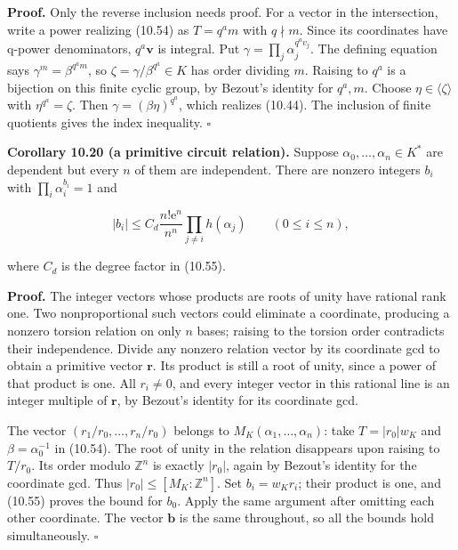 \documentclass[
  11pt,
  a4paper,
]{article}
\begin{document}
\textbf{Proof.} Only the reverse inclusion needs proof. For a vector in
the intersection, write a power realizing (10.54) as \(T=q^a m\) with
\(q\nmid m\). Since its coordinates have q-power denominators,
\(q^a\boldsymbol v\) is integral. Put
\(\gamma=\prod_j\alpha_j^{q^av_j}\). The defining equation says
\(\gamma^m=\beta^{q^am}\), so \(\zeta=\gamma/\beta^{q^a}\in K\) has
order dividing \(m\). Raising to \(q^a\) is a bijection on this finite
cyclic group, by Bezout's identity for \(q^a,m\). Choose
\(\eta\in\langle\zeta\rangle\) with \(\eta^{q^a}=\zeta\). Then
\(\gamma=(\beta\eta)^{q^a}\), which realizes (10.44). The inclusion of
finite quotients gives the index inequality. \(\square\)

\textbf{Corollary 10.20 (a primitive circuit relation).} Suppose
\(\alpha_0,\ldots,\alpha_n\in K^*\) are dependent but every \(n\) of
them are independent. There are nonzero integers \(b_i\) with
\(\prod_i\alpha_i^{b_i}=1\) and

\[
|b_i|\le C_d\frac{n!\mathrm e^n}{n^n}
\prod_{j\ne i}h(\alpha_j)\qquad(0\le i\le n),
\tag{10.58}
\]

where \(C_d\) is the degree factor in (10.55).

\textbf{Proof.} The integer vectors whose products are roots of unity
have rational rank one. Two nonproportional such vectors could eliminate
a coordinate, producing a nonzero torsion relation on only \(n\) bases;
raising to the torsion order contradicts their independence. Divide any
nonzero relation vector by its coordinate gcd to obtain a primitive
vector \(\boldsymbol r\). Its product is still a root of unity, since a
power of that product is one. All \(r_i\ne0\), and every integer vector
in this rational line is an integer multiple of \(\boldsymbol r\), by
Bezout's identity for its coordinate gcd.

The vector \((r_1/r_0,\ldots,r_n/r_0)\) belongs to
\(M_K(\alpha_1,\ldots,\alpha_n)\): take \(T=|r_0|w_K\) and
\(\beta=\alpha_0^{-1}\) in (10.54). The root of unity in the relation
disappears upon raising to \(T/r_0\). Its order modulo \(\mathbb Z^n\)
is exactly \(|r_0|\), again by Bezout's identity for the coordinate gcd.
Thus \(|r_0|\le[M_K:\mathbb Z^n]\). Set \(b_i=w_Kr_i\); their product is
one, and (10.55) proves the bound for \(b_0\). Apply the same argument
after omitting each other coordinate. The vector \(\boldsymbol b\) is
the same throughout, so all the bounds hold simultaneously. \(\square\)
\end{document}
